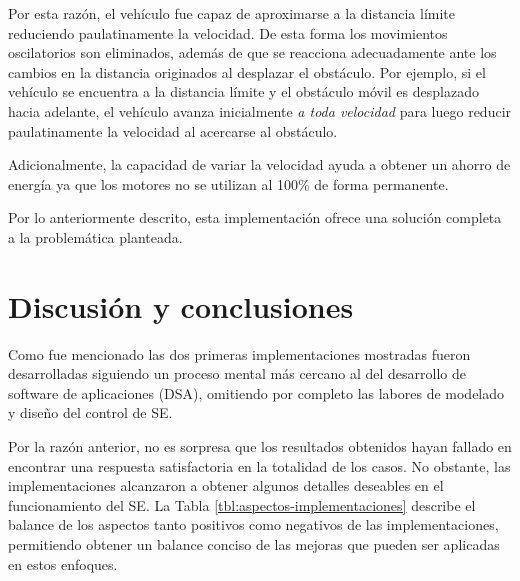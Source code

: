 \documentclass[journal]{IEEEtran}
\begin{document}
Por esta razón, el vehículo fue capaz de aproximarse a la distancia límite reduciendo paulatinamente la velocidad.
De esta forma los movimientos oscilatorios son eliminados, además de que se reacciona adecuadamente ante los cambios en la distancia originados al desplazar el obstáculo.
Por ejemplo, si el vehículo se encuentra a la distancia límite y el obstáculo móvil es desplazado hacia adelante, el vehículo avanza inicialmente \emph{a toda velocidad} para luego reducir paulatinamente la velocidad al acercarse al obstáculo.

Adicionalmente, la capacidad de variar la velocidad ayuda a obtener un ahorro de energía ya que los motores no se utilizan al 100\% de forma permanente.

Por lo anteriormente descrito, esta implementación ofrece una solución completa a la problemática planteada.

\section{Discusión y conclusiones}

Como fue mencionado las dos primeras implementaciones mostradas fueron desarrolladas siguiendo un proceso mental más cercano al del desarrollo de software de aplicaciones (DSA), omitiendo por completo las labores de modelado y diseño del control de SE.

Por la razón anterior, no es sorpresa que los resultados obtenidos hayan fallado en encontrar una respuesta satisfactoria en la totalidad de los casos.
No obstante, las implementaciones alcanzaron a obtener algunos detalles deseables en el funcionamiento del SE.
La Tabla \ref{tbl:aspectos-implementaciones} describe el balance de los aspectos tanto positivos como negativos de las implementaciones, permitiendo obtener un balance conciso de las mejoras que pueden ser aplicadas en estos enfoques.
\end{document}
